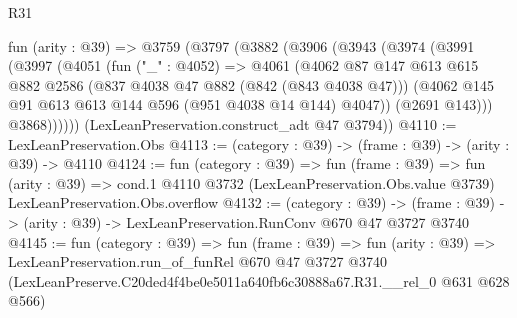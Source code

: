 \begin{lexlean}{R31}
\begin{coremodule}
  fun (arity : @39) =>
  @3759
    (@3797
      (@3882
        (@3906
          (@3943
            (@3974
              (@3991
                (@3997
                  (@4051
                    (fun ("_" : @4052) =>
                    @4061
                      (@4062
                        @87
                        @147
                        @613
                        @615
                        @882
                        @2586
                        (@837 @4038 @47 @882 (@842 (@843 @4038 @47)))
                        (@4062 @145 @91 @613 @613 @144 @596 (@951 @4038 @14 @144) @4047))
                      (@2691 @143)))
                  @3868))))))
      (LexLeanPreservation.construct_adt @47 @3794))
@4110 := LexLeanPreservation.Obs
@4113 := (category : @39) -> (frame : @39) -> (arity : @39) -> @4110
@4124 := fun (category : @39) =>
  fun (frame : @39) =>
  fun (arity : @39) =>
  cond.{1} @4110 @3732 (LexLeanPreservation.Obs.value @3739) LexLeanPreservation.Obs.overflow
@4132 := (category : @39) ->
  (frame : @39) -> (arity : @39) -> LexLeanPreservation.RunConv @670 @47 @3727 @3740
@4145 := fun (category : @39) =>
  fun (frame : @39) =>
  fun (arity : @39) =>
  LexLeanPreservation.run_of_funRel
    @670
    @47
    @3727
    @3740
    (LexLeanPreserve.C20ded4f4be0e5011a640fb6c30888a67.R31.__rel_0 @631 @628 @566)
\end{coremodule}
\end{lexlean}
